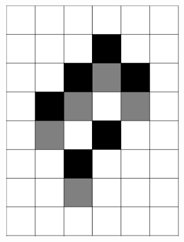 \documentclass[12pt]{article}
\numberwithin{figure}{section} %
\begin{document}
\begin{figure}[H]
\begin{subfigure}{0.19\textwidth}
     \subcaption{}
   \end{subfigure}
     \begin{subfigure}{0.19\textwidth}
     \centering
     \includegraphics[width=\linewidth]{Section4/21.1}
     \subcaption{}
   \end{subfigure}
        \begin{subfigure}{0.19\textwidth}
     \centering

\end{subfigure}
\end{figure}
\end{document}
